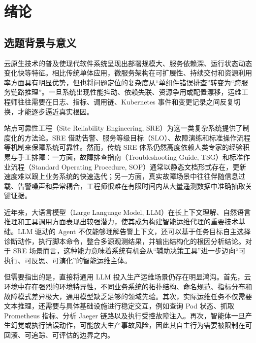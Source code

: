 
\chapter{绪论}
\label{cha:introduction}

\section{选题背景与意义}
\label{sec:background}

云原生技术的普及使现代软件系统呈现出部署规模大、服务依赖深、运行状态动态变化快等特征。相比传统单体应用，微服务架构在可扩展性、持续交付和资源利用率方面具有明显优势，但也将问题定位的复杂度从“单组件错误排查”转变为“跨服务链路推理”。一旦系统出现性能抖动、依赖失联、资源争用或配置漂移，运维工程师往往需要在日志、指标、调用链、Kubernetes 事件和变更记录之间反复切换，才能逐步逼近真实根因。

站点可靠性工程（Site Reliability Engineering, SRE）为这一类复杂系统提供了制度化的方法论。SRE 借助告警、服务等级目标（SLO）、故障演练和标准操作流程等机制来保障系统可靠性。然而，传统 SRE 体系仍然高度依赖人类专家的经验积累与手工排障：一方面，故障排查指南（Troubleshooting Guide, TSG）和标准作业流程（Standard Operating Procedure, SOP）通常以静态文档形式存在，更新速度难以跟上业务系统的快速迭代；另一方面，真实故障场景中往往伴随信息过载、告警噪声和异常耦合，工程师很难在有限时间内从大量遥测数据中准确抽取关键证据。

近年来，大语言模型（Large Language Model, LLM）在长上下文理解、自然语言推理和工具调用方面表现出较强潜力，使其成为构建智能运维代理的重要技术基础。LLM 驱动的 Agent 不仅能够理解告警上下文，还可以基于任务目标自主选择诊断动作，执行脚本命令，整合多源观测结果，并输出结构化的根因分析结论。对于 SRE 场景而言，这种能力意味着系统有机会从“辅助决策工具”进一步迈向“可执行、可反思、可演化”的智能运维主体。

但需要指出的是，直接将通用 LLM 投入生产运维场景仍存在明显鸿沟。首先，云环境中存在强烈的环境特异性，不同业务系统的拓扑结构、命名规范、指标分布和故障模式差异极大，通用模型缺乏足够的领域先验。其次，实际运维任务不仅需要文本推理，还需要与具体基础设施进行稳定交互，例如查询 Pod 状态、抓取 Prometheus 指标、分析 Jaeger 链路以及执行受控故障注入。再次，智能体一旦产生幻觉或执行错误动作，可能放大生产事故风险，因此其自主行为需要被限制在可回滚、可追踪、可评估的边界之内。

